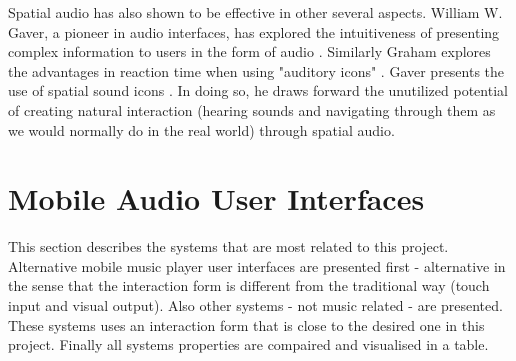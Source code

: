 

Spatial audio has also shown to be effective in other several aspects. William W. Gaver, a pioneer in audio interfaces, has explored the intuitiveness of presenting complex information to users in the form of audio \cite{gaver_sonicfinder:_1989}. Similarly Graham explores the advantages in reaction time when using "auditory icons" \cite{graham_use_1999}. Gaver presents the use of spatial sound icons \cite{gaver_auditory_1986}. In doing so, he draws forward the unutilized potential of creating natural interaction (hearing sounds and navigating through them as we would normally do in the real world) through spatial audio.




\section{Mobile Audio User Interfaces}
\label{sec:mobileaudiointerfaces}
This section describes the systems that are most related to this project. Alternative mobile music player user interfaces are presented first - alternative in the sense that the interaction form is different from the traditional way (touch input and visual output). Also other systems - not music related - are presented. These systems uses an interaction form that is close to the desired one in this project. Finally all systems properties are compaired and visualised in a table.

